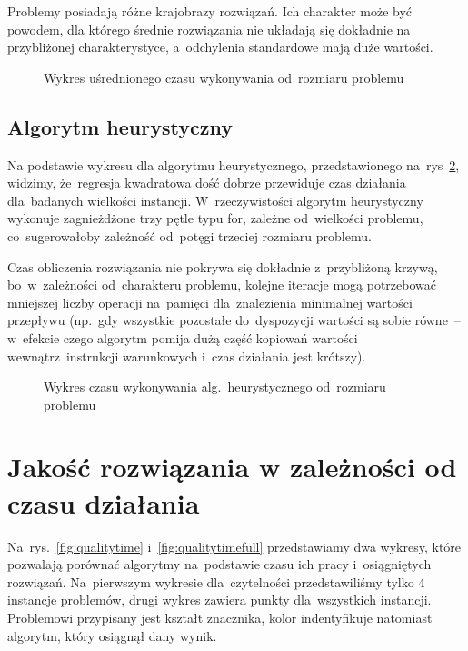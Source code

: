 \documentclass[a4paper,10pt]{article}
\begin{document}
Problemy posiadają różne krajobrazy rozwiązań.
Ich charakter może być powodem, dla którego średnie rozwiązania nie układają się dokładnie na przybliżonej charakterystyce,
a~odchylenia standardowe mają duże wartości.

\begin{figure}[h!]
\begin{center}

\caption{Wykres uśrednionego czasu wykonywania od~rozmiaru problemu}
\label{fig:timesize}
\end{center}
\end{figure}

\subsection{Algorytm heurystyczny}
Na podstawie wykresu dla algorytmu heurystycznego, przedstawionego na~rys~\ref{fig:timesizeheuristic},
widzimy, że~regresja kwadratowa dość dobrze przewiduje czas działania dla~badanych wielkości instancji.
W~rzeczywistości algorytm heurystyczny wykonuje zagnieżdżone trzy pętle typu for, zależne od~wielkości problemu,
co~sugerowałoby zależność od~potęgi trzeciej rozmiaru problemu.

Czas obliczenia rozwiązania nie pokrywa się dokładnie z~przybliżoną krzywą, bo~w~zależności od~charakteru problemu,
kolejne iteracje mogą potrzebować mniejszej liczby operacji na~pamięci dla~znalezienia minimalnej wartości przepływu
(np.~gdy wszystkie pozostałe do~dyspozycji wartości są sobie równe~-- w~efekcie czego algorytm pomija dużą część kopiowań
wartości wewnątrz~instrukcji warunkowych i~czas działania jest krótszy).

\begin{figure}[h!]
\begin{center} 

\caption{Wykres czasu wykonywania alg.~heurystycznego od~rozmiaru problemu}
\label{fig:timesizeheuristic}
\end{center}
\end{figure}

%

\section{Jakość rozwiązania w zależności od czasu działania}
Na~rys.~\ref{fig:qualitytime} i~\ref{fig:qualitytimefull} przedstawiamy dwa wykresy,
które pozwalają porównać algorytmy na~podstawie czasu ich pracy i~osiągniętych rozwiązań.
Na~pierwszym wykresie dla~czytelności przedstawiliśmy tylko 4 instancje problemów, drugi wykres zawiera punkty dla~wszystkich instancji. 
Problemowi przypisany jest kształt znacznika, kolor indentyfikuje natomiast algorytm, który osiągnął dany wynik.
\end{document}
